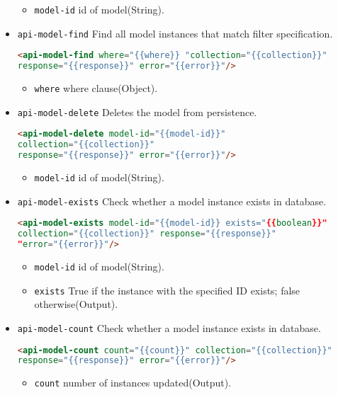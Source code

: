 \begin{itemize}
\begin{itemize}
\item \texttt{model-id} id of model(String).
\end{itemize}

\item \texttt{api-model-find} Find all model instances that match filter specification.

\begin{lstlisting}[language=html]
<api-model-find where="{{where}} "collection="{{collection}}" 
response="{{response}}" error="{{error}}"/>
\end{lstlisting}

\begin{itemize}
\item \texttt{where} where clause(Object).
\end{itemize}

\item \texttt{api-model-delete} Deletes the model from persistence.

\begin{lstlisting}[language=html]
<api-model-delete model-id="{{model-id}}" 
collection="{{collection}}" 
response="{{response}}" error="{{error}}"/>
\end{lstlisting}

\begin{itemize}
\item \texttt{model-id} id of model(String).
\end{itemize}

\item \texttt{api-model-exists} Check whether a model instance exists in database.

\begin{lstlisting}[language=html]
<api-model-exists model-id="{{model-id}} exists="{{boolean}}" 
collection="{{collection}}" response="{{response}}" 
"error="{{error}}"/>
\end{lstlisting}

\begin{itemize}
\item \texttt{model-id} id of model(String).
\item \texttt{exists} True if the instance with the specified ID exists; false otherwise(Output).
\end{itemize}

\item \texttt{api-model-count} Check whether a model instance exists in database.

\begin{lstlisting}[language=html]
<api-model-count count="{{count}}" collection="{{collection}}" 
response="{{response}}" error="{{error}}"/>
\end{lstlisting}

\begin{itemize}
\item \texttt{count} number of instances updated(Output).
\end{itemize}

\end{itemize}

